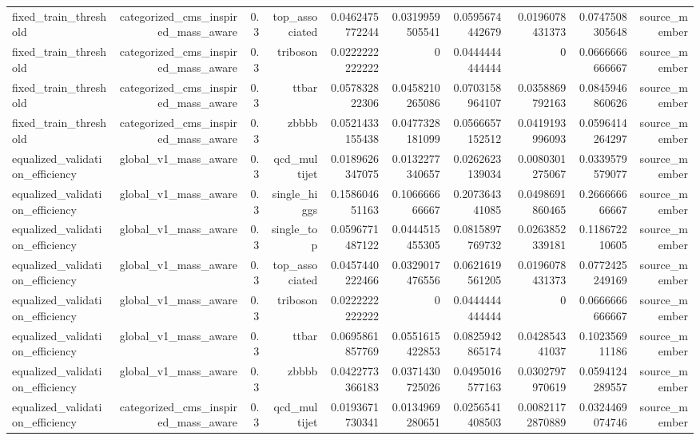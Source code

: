 \begin{table}[htbp]
{\begin{tabular}{lrrrrrrrrr}
fixed\_train\_threshold & categorized\_cms\_inspired\_mass\_aware & 0.3 & top\_associated & 0.0462475772244 & 0.0319959505541 & 0.0595674442679 & 0.0196078431373 & 0.0747508305648 & source\_member \\
fixed\_train\_threshold & categorized\_cms\_inspired\_mass\_aware & 0.3 & triboson & 0.0222222222222 & 0 & 0.0444444444444 & 0 & 0.0666666666667 & source\_member \\
fixed\_train\_threshold & categorized\_cms\_inspired\_mass\_aware & 0.3 & ttbar & 0.057832822306 & 0.0458210265086 & 0.0703158964107 & 0.0358869792163 & 0.0845946860626 & source\_member \\
fixed\_train\_threshold & categorized\_cms\_inspired\_mass\_aware & 0.3 & zbbbb & 0.0521433155438 & 0.0477328181099 & 0.0566657152512 & 0.0419193996093 & 0.0596414264297 & source\_member \\
equalized\_validation\_efficiency & global\_v1\_mass\_aware & 0.3 & qcd\_multijet & 0.0189626347075 & 0.0132277340657 & 0.0262623139034 & 0.0080301275067 & 0.0339579579077 & source\_member \\
equalized\_validation\_efficiency & global\_v1\_mass\_aware & 0.3 & single\_higgs & 0.158604651163 & 0.106666666667 & 0.207364341085 & 0.0498691860465 & 0.266666666667 & source\_member \\
equalized\_validation\_efficiency & global\_v1\_mass\_aware & 0.3 & single\_top & 0.0596771487122 & 0.0444515455305 & 0.0815897769732 & 0.0263852339181 & 0.118672210605 & source\_member \\
equalized\_validation\_efficiency & global\_v1\_mass\_aware & 0.3 & top\_associated & 0.0457440222466 & 0.0329017476556 & 0.0621619561205 & 0.0196078431373 & 0.0772425249169 & source\_member \\
equalized\_validation\_efficiency & global\_v1\_mass\_aware & 0.3 & triboson & 0.0222222222222 & 0 & 0.0444444444444 & 0 & 0.0666666666667 & source\_member \\
equalized\_validation\_efficiency & global\_v1\_mass\_aware & 0.3 & ttbar & 0.0695861857769 & 0.0551615422853 & 0.0825942865174 & 0.042854341037 & 0.102356911186 & source\_member \\
equalized\_validation\_efficiency & global\_v1\_mass\_aware & 0.3 & zbbbb & 0.0422773366183 & 0.0371430725026 & 0.0495016577163 & 0.0302797970619 & 0.0594124289557 & source\_member \\
equalized\_validation\_efficiency & categorized\_cms\_inspired\_mass\_aware & 0.3 & qcd\_multijet & 0.0193671730341 & 0.0134969280651 & 0.0256541408503 & 0.00821172870889 & 0.0324469074746 & source\_member \\

\end{tabular}}
\end{table}

